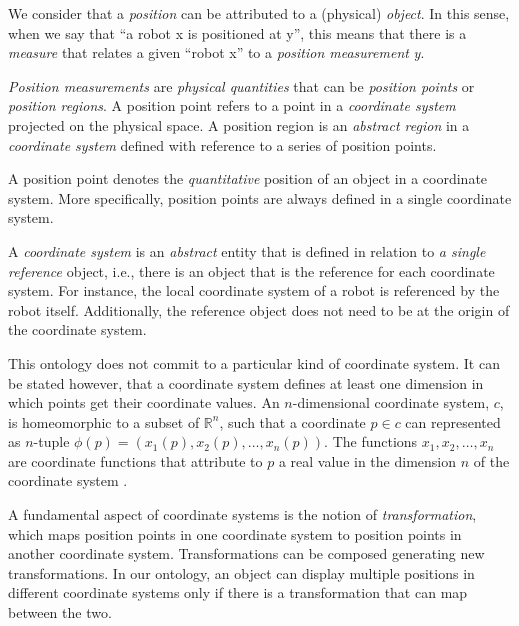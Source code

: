 \documentclass[preprint,12pt]{elsarticle}
\newcommand{\hlc}[2][yellow]{ {\sethlcolor{#1} \hl{#2}} }
\newcommand{\paulo}[1]{{\hlc[cyan]{\textbf{Paulo}: #1}}}
\newcommand{\joel}[1]{{\hlc[green]{\textbf{Joel}: #1}}}
\begin{document}

We consider that a \emph{position} can be attributed to a (physical) \emph{object}. In this sense, when we say that ``a robot x is positioned at y'', this means that there is a \emph{measure} that relates a given ``robot x'' to a \emph{position measurement} \emph{y}. 

\emph{Position measurements} are \emph{physical quantities} that can be \emph{position points} or \emph{position regions}. A position point refers to a point in a \emph{coordinate system} projected on the physical space. A position region is an \emph{abstract region} in a \emph{coordinate system} defined with reference to a series of position points.

A position point denotes the \emph{quantitative} position of an object in a coordinate system. More specifically, position points are always defined in a single coordinate system.

A \emph{coordinate system} is an \emph{abstract} entity that is defined in relation to \emph{a single reference} object, i.e., there is an object that is the reference for each coordinate system. For instance, the local coordinate system of a robot is referenced by the robot itself. Additionally, the reference object does not need to be at the origin of the coordinate system.

This ontology does not commit to a particular kind of coordinate system. It can be stated however, that a coordinate system defines at least one dimension in which points get their coordinate values. An $n$-dimensional coordinate system, $c$, is homeomorphic to a subset of $\mathbb{R}^n$, such that a coordinate $p \in c$ can represented as  $n$-tuple $\phi(p) = (x_1(p), x_2(p), \dots , x_n(p))$. The functions $x_1, x_2, \dots, x_n$ are coordinate functions that attribute to $p$ a real value in the dimension $n$ of the coordinate system \cite{Morita2001Geometry}.

A fundamental aspect of coordinate systems is the notion of \emph{transformation}, which maps position points in one coordinate system to position points in another coordinate system. Transformations can be composed generating new transformations. In our ontology, an object can display multiple positions in different coordinate systems only if there is a transformation that can map between the two.
\end{document}
